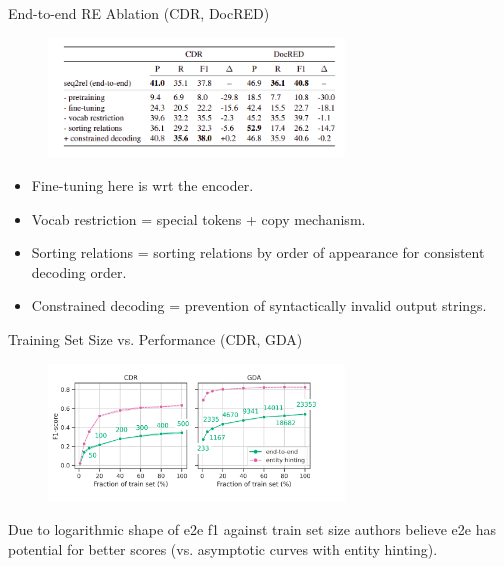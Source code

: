 \documentclass[usenames,dvipsnames,pdf]{beamer}
\begin{document}
        \begin{frame}{End-to-end RE Ablation (CDR, DocRED)}
          \begin{figure}
            \includegraphics[width=0.7\textwidth,height=0.4\textheight,keepaspectratio]{ablation} 
          \end{figure}
          \begin{itemize}
          \item
            Fine-tuning here is wrt the encoder.
          \item
            Vocab restriction = special tokens + copy mechanism.
          \item
            Sorting relations = sorting relations by order of appearance for consistent decoding order.
          \item
            Constrained decoding = prevention of syntactically invalid output strings.
          \end{itemize}
        \end{frame}

        \begin{frame}{Training Set Size vs. Performance (CDR, GDA)}
          \begin{figure}
            \includegraphics[width=0.7\textwidth,height=0.7\textheight,keepaspectratio]{training_set_size_plateau} 
          \end{figure}

          Due to logarithmic shape of e2e f1 against train set size authors believe e2e has potential for better scores (vs. asymptotic curves with entity hinting).
        \end{frame}
\end{document}
